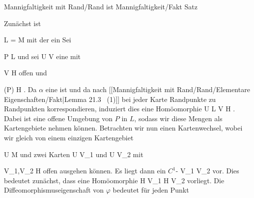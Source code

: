 {Mannigfaltigkeit mit Rand/Rand ist Mannigfaltigkeit/Fakt}
{Satz}
{}
{

\faktzusatz {}
\faktzusatz {}

}
{

Zunächst ist

\mavergleichskette
{\vergleichskette
{ L
}
{ = }{ \partial M
}
{  }{
}
{    }{
}
{   }{
}
}
{}{}{}
mit der
ein
Sei

\mavergleichskette
{\vergleichskette
{ P
}
{ \in }{ L
}
{  }{
}
{    }{
}
{   }{
}
}
{}{}{}
und sei
\maabbdisp {\alpha} { U } { V
} {}
eine
mit

\mavergleichskette
{\vergleichskette
{ V
}
{ \subseteq }{ H
}
{  }{
}
{    }{
}
{   }{
}
}
{}{}{}
offen und

\mavergleichskette
{\vergleichskette
{ \alpha(P)
}
{ \in }{ \partial H
}
{  }{
}
{    }{
}
{   }{
}
}
{}{}{.}
Da $\alpha$ eine
ist und da nach
[[Mannigfaltigkeit mit Rand/Rand/Elementare Eigenschaften/Fakt|Lemma 21.3  (1)]]
bei jeder Karte Randpunkte zu Randpunkten korrespondieren, induziert dies eine Homöomorphie
\maabbdisp {} {U \cap L} {V \cap \partial H
} {.}
Dabei ist
 eine offene Umgebung von $P$ in $L$, sodass wir diese Mengen als Kartengebiete nehmen können. Betrachten wir nun einen Kartenwechsel, wobei wir gleich von einem einzigen Kartengebiet

\mavergleichskette
{\vergleichskette
{ U
}
{ \subseteq }{ M
}
{  }{
}
{    }{
}
{   }{
}
}
{}{}{}
und zwei Karten
 { U } { V_1
} {} und  { U } { V_2
} {}
mit

\mavergleichskette
{\vergleichskette
{ V_1,V_2
}
{ \subseteq }{ H
}
{  }{
}
{    }{
}
{   }{
}
}
{}{}{}
offen ausgehen können. Es liegt dann ein
$C^1$-
 {V_1 } { V_2
} {}
vor. Dies bedeutet zunächst, dass eine Homöomorphie
\maabb {} { \partial H \cap V_1 } { \partial H \cap V_2
} {}
vorliegt. Die Diffeomorphismuseigenschaft von $\varphi$ bedeutet für jeden Punkt

}
